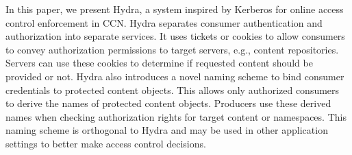 In this paper, we present Hydra, a system inspired by Kerberos for online access control
enforcement in CCN. Hydra separates consumer authentication and authorization into
separate services. It uses tickets or cookies to allow consumers to convey authorization
permissions to target servers, e.g., content repositories. Servers can use these cookies
to determine if requested content should be provided or not. Hydra also introduces a
novel naming scheme to bind consumer credentials to protected content objects. This
allows only authorized consumers to derive the names of protected content objects.
Producers use these derived names when checking authorization rights for target content
or namespaces. This naming scheme is orthogonal to Hydra and may be used in other
application settings to better make access control decisions.
